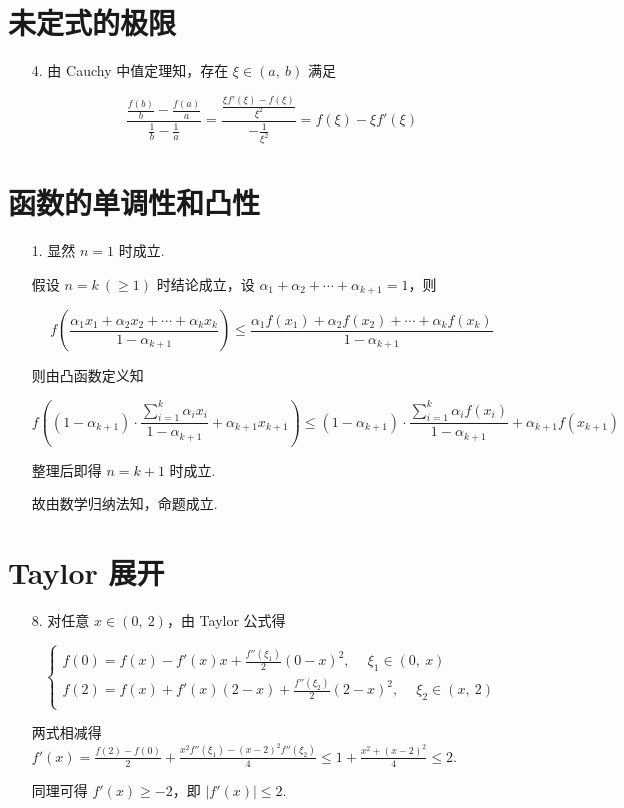 \documentclass[oneside]{ctexbook} %
\begin{document}
\section{未定式的极限}

\begin{enumerate}
    \item[4.]
    由 Cauchy 中值定理知，存在 $\xi \in (a,\ b)$ 满足
    
    $$
    \frac{\frac {f(b)} b - \frac {f(a)} a}{\frac 1 b - \frac 1 a} = \frac{\frac{\xi f'(\xi) - f(\xi)}{\xi^2}}{-\frac 1 {\xi^2}} = f(\xi) - \xi f'(\xi)
    $$
\end{enumerate}

\section{函数的单调性和凸性}

\begin{enumerate}
    \item[1.]
    显然 $n = 1$ 时成立.
    
    假设 $n=k \ (\geqslant 1)$ 时结论成立，设 $\alpha_1 + \alpha_2 + \cdots + \alpha_{k+1} = 1$，则
    
    $$
    f(\frac{\alpha_1x_1 + \alpha_2x_2 + \cdots + \alpha_kx_k}{1-\alpha_{k+1}}) \leqslant \frac{\alpha_1f(x_1) + \alpha_2f(x_2) + \cdots + \alpha_kf(x_k)}{1-\alpha_{k+1}}
    $$
    
    则由凸函数定义知
    
    $$
    f\left( (1-\alpha_{k+1}) \cdot \frac{\sum_{i=1}^k \alpha_ix_i}{1-\alpha_{k+1}} + \alpha_{k+1}x_{k+1} \right) \leqslant (1-\alpha_{k+1}) \cdot \frac{\sum_{i=1}^k \alpha_if(x_i)}{1-\alpha_{k+1}} + \alpha_{k+1}f(x_{k+1})
    $$
    
    整理后即得 $n = k+1$ 时成立.
    
    故由数学归纳法知，命题成立.
\end{enumerate}

\section{Taylor 展开}

\begin{enumerate}
    \item[8.]
    对任意 $x \in (0,\ 2)$，由 Taylor 公式得
    
    $$
    \begin{cases}
        f(0) = f(x) - f'(x)x + \frac {f''(\xi_1)} 2 (0-x)^2 ,\ \quad \xi_1 \in (0,\ x) \\
        f(2) = f(x) + f'(x)(2-x) + \frac {f''(\xi_2)} 2 (2-x)^2 ,\ \quad \xi_2 \in (x,\ 2) \\
    \end{cases}
    $$
    
    两式相减得 $f'(x) = \frac {f(2)-f(0)} 2 + \frac {x^2 f''(\xi_1) - (x-2)^2 f''(\xi_2)} 4 \leqslant 1 + \frac{x^2 + (x-2)^2} 4 \leqslant 2$.
    
    同理可得 $f'(x) \geqslant -2$，即 $|f'(x)| \leqslant 2$.
\end{enumerate}
\end{document}
